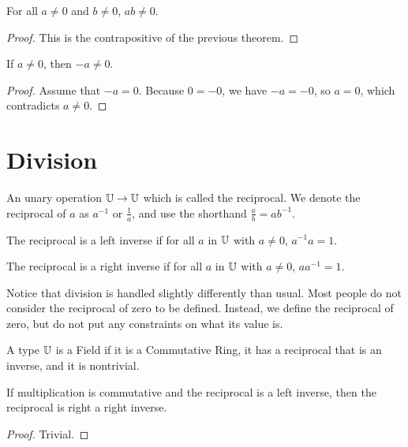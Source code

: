 \documentclass[../math.tex]{subfiles}
\begin{document}
\begin{theorem} \label{mult_nz}
    For all $a \neq 0$ and $b \neq 0$, $ab \neq 0$.
\end{theorem}
\begin{proof}
    This is the contrapositive of the previous theorem.
\end{proof}

\begin{theorem}
    If $a \neq 0$, then $-a \neq 0$.
\end{theorem}
\begin{proof}
    Assume that $-a = 0$.  Because $0 = -0$, we have $-a = -0$, so $a = 0$,
    which contradicts $a \neq 0$.
\end{proof}

\section{Division}

\begin{class}
    An unary operation $\mathbb{U} \rightarrow \mathbb{U}$ which is called the reciprocal.  We
    denote the reciprocal of $a$ as $a^{-1}$ or $\frac{1}{a}$, and use the
    shorthand $\frac{a}{b} = a b^{-1}$.
\end{class}

\begin{class}
    The reciprocal is a left inverse if for all $a$ in $\mathbb{U}$ with $a \neq 0$,
    $a^{-1}a = 1$.
\end{class}

\begin{class}
    The reciprocal is a right inverse if for all $a$ in $\mathbb{U}$ with $a \neq 0$,
    $aa^{-1} = 1$.
\end{class}

Notice that division is handled slightly differently than usual.  Most people do
not consider the reciprocal of zero to be defined.  Instead, we define the
reciprocal of zero, but do not put any constraints on what its value is.

\begin{class}[Field]
    A type $\mathbb{U}$ is a Field if it is a Commutative Ring, it has a reciprocal that
    is an inverse, and it is nontrivial.
\end{class}

\begin{instance}
    If multiplication is commutative and the reciprocal is a left inverse, then
    the reciprocal is right a right inverse.
\end{instance}
\begin{proof}
    Trivial.
\end{proof}
\end{document}
